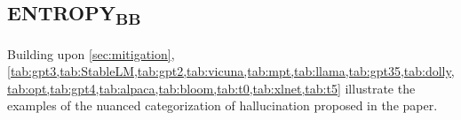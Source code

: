 

\subsection{ENTROPY\textsubscript{BB}}
\label{app:bb}

Building upon \cref{sec:mitigation}, \cref{tab:gpt3,tab:StableLM,tab:gpt2,tab:vicuna,tab:mpt,tab:llama,tab:gpt35,tab:dolly,tab:opt,tab:gpt4,tab:alpaca,tab:bloom,tab:t0,tab:xlnet,tab:t5} illustrate the examples of the nuanced categorization of hallucination proposed in the paper.


